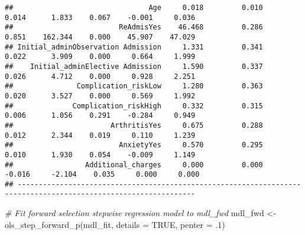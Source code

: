\documentclass[
]{article}
\newenvironment{Shaded}{\begin{snugshade}}{\end{snugshade}}
\newcommand{\AttributeTok}[1]{\textcolor[rgb]{0.77,0.63,0.00}{#1}}
\newcommand{\CommentTok}[1]{\textcolor[rgb]{0.56,0.35,0.01}{\textit{#1}}}
\newcommand{\ConstantTok}[1]{\textcolor[rgb]{0.00,0.00,0.00}{#1}}
\newcommand{\DecValTok}[1]{\textcolor[rgb]{0.00,0.00,0.81}{#1}}
\newcommand{\FunctionTok}[1]{\textcolor[rgb]{0.00,0.00,0.00}{#1}}
\newcommand{\NormalTok}[1]{#1}
\newcommand{\OtherTok}[1]{\textcolor[rgb]{0.56,0.35,0.01}{#1}}
\begin{document}
\begin{verbatim}
##                                Age     0.018         0.010        0.014      1.833    0.067    -0.001     0.036 
##                         ReAdmisYes    46.468         0.286        0.851    162.344    0.000    45.907    47.029 
## Initial_adminObservation Admission     1.331         0.341        0.022      3.909    0.000     0.664     1.999 
##    Initial_adminElective Admission     1.590         0.337        0.026      4.712    0.000     0.928     2.251 
##               Complication_riskLow     1.280         0.363        0.020      3.527    0.000     0.569     1.992 
##              Complication_riskHigh     0.332         0.315        0.006      1.056    0.291    -0.284     0.949 
##                       ArthritisYes     0.675         0.288        0.012      2.344    0.019     0.110     1.239 
##                         AnxietyYes     0.570         0.295        0.010      1.930    0.054    -0.009     1.149 
##                 Additional_charges     0.000         0.000       -0.016     -2.104    0.035     0.000     0.000 
## ----------------------------------------------------------------------------------------------------------------
\end{verbatim}

\begin{Shaded}
\begin{Highlighting}[]
\CommentTok{\# Fit forward selection stepwise regression model to mdl\_fwd }
\NormalTok{mdl\_fwd }\OtherTok{\textless{}{-}} \FunctionTok{ols\_step\_forward\_p}\NormalTok{(mdl\_fit, }\AttributeTok{details =} \ConstantTok{TRUE}\NormalTok{, }\AttributeTok{penter =}\NormalTok{ .}\DecValTok{1}\NormalTok{)}
\end{Highlighting}
\end{Shaded}
\end{document}
